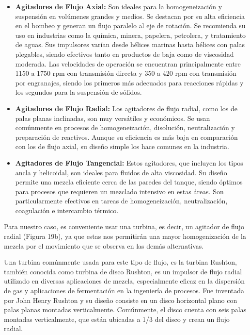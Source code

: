 \documentclass[14pt,oneside]{extarticle} %
\begin{document}
\begin{itemize}
    \item \textbf{Agitadores de Flujo Axial:} Son ideales para la homogeneización y suspensión en volúmenes grandes y medios. Se destacan por su alta eficiencia en el bombeo y generan un flujo paralelo al eje de rotación. Se recomienda su uso en industrias como la química, minera, papelera, petrolera, y tratamiento de aguas. Sus impulsores varían desde hélices marinas hasta hélices con palas plegables, siendo efectivos tanto en productos de baja como de viscosidad moderada. Las velocidades de operación se encuentran principalmente entre 1150 a 1750 rpm con transmisión directa y 350 a 420 rpm con transmisión por engranajes, siendo los primeros más adecuados para reacciones rápidas y los segundos para la suspensión de sólidos.
    \item \textbf{Agitadores de Flujo Radial:} Los agitadores de flujo radial, como los de palas planas inclinadas, son muy versátiles y económicos. Se usan comúnmente en procesos de homogeneización, disolución, neutralización y preparación de reactivos. Aunque su eficiencia es más baja en comparación con los de flujo axial, su diseño simple los hace comunes en la industria.
    \item \textbf{Agitadores de Flujo Tangencial:} Estos agitadores, que incluyen los tipos ancla y helicoidal, son ideales para fluidos de alta viscosidad. Su diseño permite una mezcla eficiente cerca de las paredes del tanque, siendo óptimos para procesos que requieren un mezclado intensivo en estas áreas. Son particularmente efectivos en tareas de homogeneización, neutralización, coagulación e intercambio térmico.
\end{itemize}

Para nuestro caso, es conveniente usar una turbina, es decir, un agitador de flujo radial (Figura 19b), ya que estas nos permitirán una mayor homogenización de la mezcla por el movimiento que se observa en las demás alternativas.

Una turbina comúnmente usada para este tipo de flujo, es la turbina Rushton, también conocida como turbina de disco Rushton, es un impulsor de flujo radial utilizado en diversas aplicaciones de mezcla, especialmente eficaz en la dispersión de gas y aplicaciones de fermentación en la ingeniería de procesos. Fue inventada por John Henry Rushton y su diseño consiste en un disco horizontal plano con palas planas montadas verticalmente. Comúnmente, el disco cuenta con seis palas montadas verticalmente, que están ubicadas a 1/3 del disco y crean un flujo radial.
\end{document}
